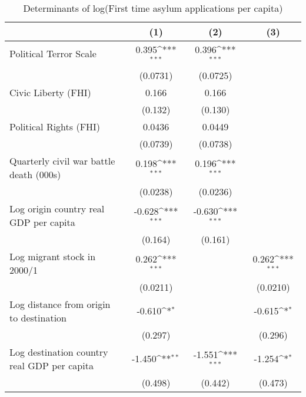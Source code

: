 \begin{table}[htbp]\centering
\def\sym#1{\ifmmode^{#1}\else\(^{#1}\)\fi}
\caption{Determinants of log(First time asylum applications per capita)}
\begin{tabular}{l*{3}{c}}
\hline\hline
                    &\multicolumn{1}{c}{(1)}         &\multicolumn{1}{c}{(2)}         &\multicolumn{1}{c}{(3)}         \\
\hline
Political Terror Scale&       0.395\sym{***}&       0.396\sym{***}&                     \\
                    &    (0.0731)         &    (0.0725)         &                     \\
[1em]
Civic Liberty (FHI) &       0.166         &       0.166         &                     \\
                    &     (0.132)         &     (0.130)         &                     \\
[1em]
Political Rights (FHI)&      0.0436         &      0.0449         &                     \\
                    &    (0.0739)         &    (0.0738)         &                     \\
[1em]
Quarterly civil war battle death (000s)&       0.198\sym{***}&       0.196\sym{***}&                     \\
                    &    (0.0238)         &    (0.0236)         &                     \\
[1em]
Log origin country real GDP per capita&      -0.628\sym{***}&      -0.630\sym{***}&                     \\
                    &     (0.164)         &     (0.161)         &                     \\
[1em]
Log migrant stock in 2000/1&       0.262\sym{***}&                     &       0.262\sym{***}\\
                    &    (0.0211)         &                     &    (0.0210)         \\
[1em]
Log distance from origin to destination&      -0.610\sym{*}  &                     &      -0.615\sym{*}  \\
                    &     (0.297)         &                     &     (0.296)         \\
[1em]
Log destination country real GDP per capita&      -1.450\sym{**} &      -1.551\sym{***}&      -1.254\sym{*}  \\
                    &     (0.498)         &     (0.442)         &     (0.473)         \\

\end{tabular}
\end{table}

